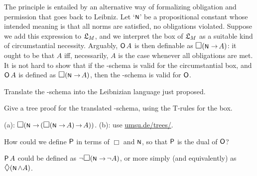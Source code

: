The  principle is entailed by an alternative way of formalizing obligation
and permission that goes back to Leibniz. Let `$\OK$' be a propositional
constant whose intended meaning is that all norms are satisfied, no obligations
violated. Suppose we add this expression to $\mathfrak{L}_M$, and we interpret the box of
$\mathfrak{L}_M$ as a suitable kind of circumstantial necessity. Arguably, $\operatorname{\mathsf{O}} A$ is then
definable as $\Box (\OK \to A)$: it ought to be that $A$ iff, necessarily, $A$
is the case whenever all obligations are met. It is not hard to show that if the
-schema is valid for the circumstantial box, and $\operatorname{\mathsf{O}} A$ is defined as
$\Box(\OK \to A)$, then the -schema is valid for $\operatorname{\mathsf{O}}$.



\begin{exercise}
  \beginwithlist
  \begin{exlist}
    \item Translate the -schema into the Leibnizian language just
    proposed.
  \item Give a tree proof for the translated -schema, using the T-rules
    for the box. 
  \end{exlist}
\end{exercise}
\begin{solution}
  (a): $\Box(\OK \to (\Box(\OK \to A) \to A))$. (b): use 
  \href{https://www.umsu.de/trees/}{umsu.de/trees/}.
\end{solution}


\begin{exercise}
  How could we define $\operatorname{\mathsf{P}}$ in terms of $\Box$ and $\OK$, so that $\operatorname{\mathsf{P}}$ is the
  dual of $\operatorname{\mathsf{O}}$? 
\end{exercise}
\begin{solution}
  $\operatorname{\mathsf{P}} A$ could be defined as $\neg\Box(\OK \to \neg A)$, or more simply (and
  equivalently) as $\Diamond (\OK \land A)$.
\end{solution}




